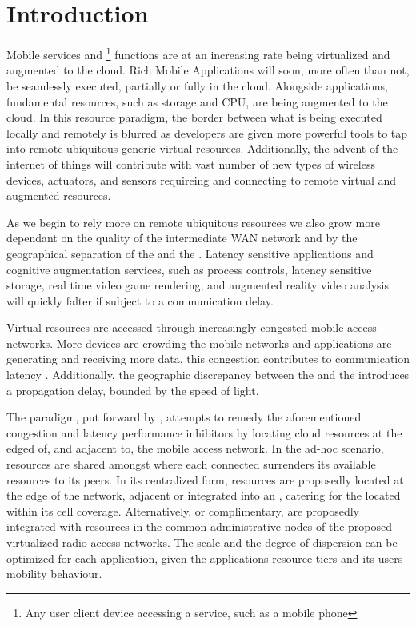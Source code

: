 \section{Introduction}

Mobile services and \ue{} \footnote{Any user client device accessing a service, such as a mobile phone} functions are at an increasing rate being virtualized and augmented to the cloud. Rich Mobile Applications \cite{March2011618} will soon, more often than not, be seamlessly executed, partially or fully in the cloud. Alongside applications, fundamental \ue{} resources, such as storage and CPU, are being augmented to the cloud. In this resource paradigm, the border between what is being executed locally and remotely is blurred as developers are given more powerful tools to tap into remote ubiquitous generic virtual resources. Additionally, the advent of the internet of things will contribute with vast number of new types of wireless devices, actuators, and sensors requireing and connecting to remote virtual and augmented resources. 


As we begin to rely more on remote ubiquitous resources we also grow more dependant on the quality of the  intermediate WAN network and by the geographical separation of the \ue{} and the \dc{} \cite{choi2007analysis}. Latency sensitive applications and cognitive augmentation services, such as process controls, latency sensitive storage, real time video game rendering, and augmented reality video analysis will quickly falter if subject to a  communication delay.

Virtual resources are accessed through increasingly congested mobile access networks. More devices are crowding the mobile networks and applications are generating and receiving more data, this congestion contributes to communication latency \cite{hu2005measurement}. Additionally, the geographic discrepancy between the \ue{} and the \dc{} introduces a propagation delay, bounded by the speed of light.

The \xcloud{} paradigm, put forward by \cite{chandra2013decentralized,ericsson_akami,satyanarayanan2009case,kiukkonen2010towards,March2011618}, attempts to remedy the aforementioned congestion and latency performance inhibitors by locating cloud resources at the edged of, and adjacent to, the mobile access network. In the ad-hoc scenario, resources are shared amongst \ues{} where each connected \ue{} surrenders its available resources to its peers. In its centralized form, \dc{} resources are proposedly located at the edge of the network, adjacent or integrated into an \rbs{}, catering for the \ues{} located within its cell coverage. Alternatively, or complimentary, \dcs{} are proposedly integrated with resources in the common administrative nodes of the proposed virtualized radio access networks. The scale and the degree of dispersion can be optimized for each application, given the applications resource tiers and its users mobility behaviour.

